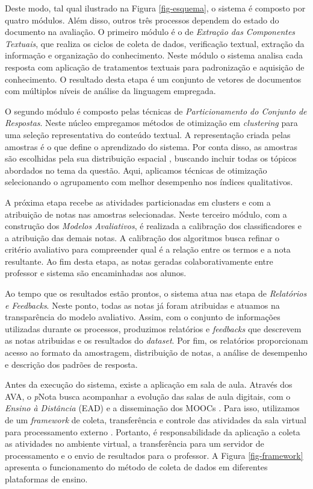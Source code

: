 Deste modo, tal qual ilustrado na Figura \ref{fig-esquema}, o sistema é composto por quatro módulos. Além disso, outros três processos dependem do estado do documento na avaliação. O primeiro módulo é o de \textit{Extração das Componentes Textuais}, que realiza os ciclos de coleta de dados, verificação textual, extração da informação e organização do conhecimento. Neste módulo o sistema analisa cada resposta com aplicação de tratamentos textuais para padronização e aquisição de conhecimento. O resultado desta etapa é um conjunto de vetores de documentos com múltiplos níveis de análise da linguagem empregada.

O segundo módulo é composto pelas técnicas de \textit{Particionamento do Conjunto de Respostas}. Neste núcleo empregamos métodos de otimização em \textit{clustering} para uma seleção representativa do conteúdo textual. A representação criada pelas amostras é o que define o aprendizado do sistema. Por conta disso, as amostras são escolhidas pela sua distribuição espacial \cite{salton1975, baeza2011}, buscando incluir todas os tópicos abordados no tema da questão. Aqui, aplicamos técnicas de otimização selecionando o agrupamento com melhor desempenho nos índices qualitativos. 

A próxima etapa recebe as atividades particionadas em clusters e com a atribuição de notas nas amostras selecionadas. Neste terceiro módulo, com a construção dos \textit{Modelos Avaliativos}, é realizada a calibração dos classificadores e a atribuição das demais notas. A calibração dos algoritmos busca refinar o critério avaliativo para compreender qual é a relação entre os termos e a nota resultante. Ao fim desta etapa, as notas geradas colaborativamente entre professor e sistema são encaminhadas aos alunos.

Ao tempo que os resultados estão prontos, o sistema atua nas etapa de \textit{Relatórios e Feedbacks}. Neste ponto, todas as notas já foram atribuidas e atuamos na transparência do modelo avaliativo. Assim, com o conjunto de informações utilizadas durante os processos, produzimos relatórios e \textit{feedbacks} que descrevem as notas atribuidas e os resultados do \textit{dataset}. Por fim, os relatórios proporcionam acesso ao formato da amostragem, distribuição de notas, a análise de desempenho e descrição dos padrões de resposta. 

Antes da execução do sistema, existe a aplicação em sala de aula. Através dos AVA, o \textit{p}Nota busca acompanhar a evolução das salas de aula digitais, com o \textit{Ensino à Distância} (EAD) e a disseminação dos MOOCs \cite{mohapatra2017}. Para isso, utilizamos de um \textit{framework} de coleta, transferência e controle das atividades da sala virtual para processamento externo \cite{spalenza2018}. Portanto, é responsabilidade da aplicação a coleta as atividades no ambiente virtual, a transferência para um servidor de processamento e o envio de resultados para o professor. A Figura \ref{fig-framework} apresenta o funcionamento do método de coleta de dados em diferentes plataformas de ensino.

